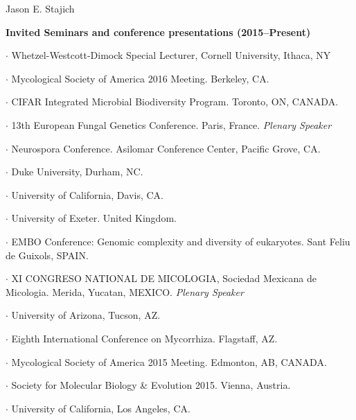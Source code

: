 \documentclass[10pt]{article}
\begin{document}
\begin{cv}{\centerline{Jason E. Stajich}}
\begin{cvlistcompact}{\bf Invited Seminars and conference presentations (2015--Present)}
\item $\cdot$ Whetzel-Westcott-Dimock Special Lecturer, Cornell University, Ithaca, NY
\item [2016] $\cdot$ Mycological Society of America 2016 Meeting. Berkeley, CA.
\item $\cdot$ CIFAR Integrated Microbial Biodiversity Program. Toronto, ON, CANADA.
  \item $\cdot$ 13th European Fungal Genetics Conference. Paris, France.  {\it Plenary Speaker}
  \item $\cdot$ Neurospora Conference. Asilomar Conference Center, Pacific
    Grove, CA.
  \item $\cdot$ Duke University, Durham, NC.
  \item $\cdot$ University of California, Davis,
    CA.
  \item $\cdot$ University of Exeter. United Kingdom.
\item [2015] $\cdot$  EMBO Conference:  Genomic complexity and diversity of eukaryotes. Sant Feliu de Guixols, SPAIN.  %
\item $\cdot$  XI CONGRESO NATIONAL DE MICOLOGIA, Sociedad Mexicana de
  Micologia. Merida, Yucatan, MEXICO. {\it Plenary Speaker}  %
  \item $\cdot$ University of Arizona, Tucson, AZ. %
  \item $\cdot$  Eighth International Conference on Mycorrhiza. Flagstaff, AZ. %
  \item $\cdot$ %
    Mycological Society of America 2015 Meeting. Edmonton, AB, CANADA.
  \item $\cdot$  Society for Molecular Biology \& Evolution
    2015. Vienna, Austria. %
  \item $\cdot$  University of California, Los Angeles, CA.

\end{cvlistcompact}
\end{cv}
\end{document}
